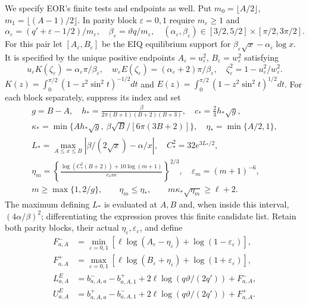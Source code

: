 \documentclass[11pt,a4paper]{article}
\begin{document}
We specify EOR's finite tests and endpoints as well. Put
$m_0=\lfloor A/2\rfloor$, $m_1=\lfloor(A-1)/2\rfloor$. In parity block
$\varepsilon=0,1$ require $m_\varepsilon\ge1$ and
\[
\alpha_\varepsilon=(q'+\varepsilon-1/2)/m_\varepsilon,\quad
\beta_\varepsilon=\vartheta q/m_\varepsilon,\quad
(\alpha_\varepsilon,\beta_\varepsilon)\in
 [3/2,5/2]\times[\pi/2,3\pi/2].
\tag{EFP6}\label{efp:parity}
\]
For this pair let $[A_\varepsilon,B_\varepsilon]$ be the EIQ equilibrium
support for $\beta_\varepsilon\sqrt{x}-\alpha_\varepsilon\log x$.
It is specified by the unique positive endpoints
$A_\varepsilon=u_\varepsilon^2$, $B_\varepsilon=w_\varepsilon^2$ satisfying
\[
u_\varepsilon K(\zeta_\varepsilon)=
 \alpha_\varepsilon\pi/\beta_\varepsilon,\quad
w_\varepsilon E(\zeta_\varepsilon)=
 (\alpha_\varepsilon+2)\pi/\beta_\varepsilon,\quad
\zeta_\varepsilon^2=1-u_\varepsilon^2/w_\varepsilon^2.
\]
$K(z)=\int_0^{\pi/2}(1-z^2\sin^2t)^{-1/2}dt$ and
$E(z)=\int_0^{\pi/2}(1-z^2\sin^2t)^{1/2}dt$.
For each block separately, suppress its index and set
\[
\begin{gathered}
g=B-A,\quad h_*=\frac{\beta}{2\pi(B+1)(B+2)(B+3)},\quad
c_*=\tfrac23h_*\sqrt g,\\
\kappa_*=\min\{Ah_*\sqrt g,\ \beta\sqrt B/[6\pi(3B+2)]\},
\quad\eta_*=\min\{A/2,1\},\\
L_*=\max_{A\le x\le B}|\beta/(2\sqrt x)-\alpha/x|,
\quad C_*^2=32e^{3L_*/2},\\
\eta_m=\left\{\frac{\log(C_*^2(B+2))+10\log(m+1)}
                         {c_*m}\right\}^{2/3},
\quad \varepsilon_m=(m+1)^{-6},\\
m\ge\max\{1,2/g\},\qquad \eta_m\le\eta_*,
\qquad m\kappa_*\sqrt{\eta_m}\ge\ell+2 .
\end{gathered}\tag{EFP7}\label{efp:eguards}
\]
The maximum defining $L_*$ is evaluated at $A,B$ and, when inside this
interval, $(4\alpha/\beta)^2$; differentiating the expression proves
this finite candidate list. Retain both parity blocks, their actual
$\eta_\varepsilon,\varepsilon_\varepsilon$, and define
\[
\begin{aligned}
F^-_{a,A}&=\min_{\varepsilon=0,1}
 [\ell\log(A_\varepsilon-\eta_\varepsilon)
                    +\log(1-\varepsilon_\varepsilon)],\\
F^+_{a,A}&=\max_{\varepsilon=0,1}
 [\ell\log(B_\varepsilon+\eta_\varepsilon)
                    +\log(1+\varepsilon_\varepsilon)],\\
L^E_{a,A}&=b^-_{a,A,a}-b^+_{a,A,1}
                 +2\ell\log(q\vartheta/(2q'))+F^-_{a,A},\\
U^E_{a,A}&=b^+_{a,A,a}-b^-_{a,A,1}
                 +2\ell\log(q\vartheta/(2q'))+F^+_{a,A}.
\end{aligned}\tag{EFP8}\label{efp:econstants}
\]
\end{document}
